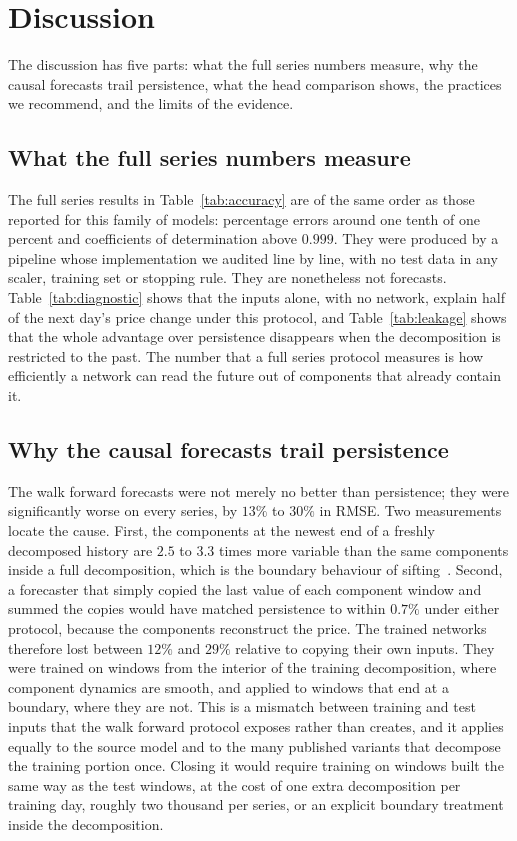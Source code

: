 
\section{Discussion}\label{sec:discussion}

The discussion has five parts: what the full series numbers measure, why the
causal forecasts trail persistence, what the head comparison shows, the
practices we recommend, and the limits of the evidence.

\subsection{What the full series numbers measure}
The full series results in Table~\ref{tab:accuracy} are of the same order as
those reported for this family of models: percentage errors around one tenth
of one percent and coefficients of determination above $0.999$. They were
produced by a pipeline whose implementation we audited line by line, with no
test data in any scaler, training set or stopping rule. They are nonetheless
not forecasts. Table~\ref{tab:diagnostic} shows that the inputs alone, with no
network, explain half of the next day's price change under this protocol, and
Table~\ref{tab:leakage} shows that the whole advantage over persistence
disappears when the decomposition is restricted to the past. The number that a
full series protocol measures is how efficiently a network can read the future
out of components that already contain it.

\subsection{Why the causal forecasts trail persistence}
The walk forward forecasts were not merely no better than persistence; they
were significantly worse on every series, by $13\%$ to $30\%$ in RMSE. Two
measurements locate the cause. First, the components at the newest end of a
freshly decomposed history are $2.5$ to $3.3$ times more variable than the same
components inside a full decomposition, which is the boundary behaviour of
sifting~\cite{emdtutorial2023}. Second, a forecaster that simply copied the
last value of each component window and summed the copies would have matched
persistence to within $0.7\%$ under either protocol, because the components
reconstruct the price. The trained networks therefore lost between $12\%$ and
$29\%$ relative to copying their own inputs. They were trained on windows from
the interior of the training decomposition, where component dynamics are
smooth, and applied to windows that end at a boundary, where they are not. This
is a mismatch between training and test inputs that the walk forward protocol
exposes rather than creates, and it applies equally to the source model and to
the many published variants that decompose the training portion once. Closing
it would require training on windows built the same way as the test windows,
at the cost of one extra decomposition per training day, roughly two thousand
per series, or an explicit boundary treatment inside the decomposition.

